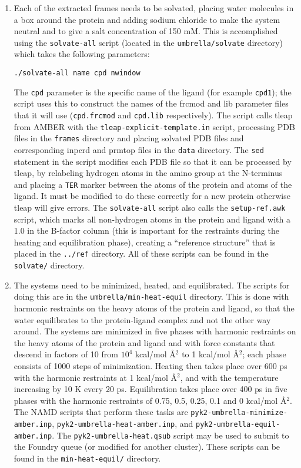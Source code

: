 \documentclass{article}      %
\begin{document}
\begin{enumerate}
\item Each of the extracted frames needs to be solvated, placing water molecules in a box around the protein and adding sodium chloride to make the system neutral and to give a salt concentration of 150 mM.  This is accomplished using the \verb+solvate-all+ script (located in the \verb+umbrella/solvate+ directory) which takes the following parameters:
\begin{verbatim}
./solvate-all name cpd nwindow
\end{verbatim}
The \verb+cpd+ parameter is the specific name of the ligand (for example \verb+cpd1+); the script uses this to construct the names of the frcmod and lib parameter files that it will use (\verb+cpd.frcmod+ and \verb+cpd.lib+ respectively).  The script calls tleap from AMBER with the \verb+tleap-explicit-template.in+ script, processing PDB files in  the \verb+frames+ directory and placing solvated PDB files and corresponding inpcrd and prmtop files in the \verb+data+ directory.  The \verb+sed+ statement in the script modifies each PDB file so that it can be processed by tleap, by relabeling hydrogen atoms in the amino group at the N-terminus and placing a \verb+TER+ marker between the atoms of the protein and atoms of the ligand.  It must be modified to do these correctly for a new protein otherwise tleap will give errors.  The \verb+solvate-all+ script also calls the \verb+setup-ref.awk+ script, which marks all non-hydrogen atoms in the protein and ligand with a 1.0 in the B-factor column (this is important for the restraints during the heating and equilibration phase), creating a ``reference structure'' that is placed in the \verb+../ref+ directory.  All of these scripts can be found in the \verb+solvate/+ directory.

\item The systems need to be minimized, heated, and equilibrated.   The scripts for doing this are in the \verb+umbrella/min-heat-equil+ directory.  This is done with harmonic restraints on the heavy atoms of the protein and ligand, so that the water equilibrates to the protein-ligand complex and not the other way around.  The systems are minimized in five phases with harmonic restraints on the heavy atoms of the protein and ligand and with force constants that descend in factors of 10 from $10^4$ kcal/mol \AA${}^2$ to 1 kcal/mol \AA${}^2$; each phase consists of 1000 steps of minimization.  Heating then takes place over 600 ps with the harmonic restraints at 1 kcal/mol \AA${}^2$, and with the temperature increasing by 10 K every 20 ps.  Equilibration takes place over 400 ps in five phases with the harmonic restraints of 0.75, 0.5, 0.25, 0.1 and 0 kcal/mol \AA${}^2$. The NAMD scripts  that perform these tasks are \verb+pyk2-umbrella-minimize-amber.inp+, \verb+pyk2-umbrella-heat-amber.inp+, and \verb+pyk2-umbrella-equil-amber.inp+.   The \verb+pyk2-umbrella-heat.qsub+ script may be used to submit to the Foundry queue (or modified for another cluster).  These scripts can be found in the \verb+min-heat-equil/+ directory.


\end{enumerate}
\end{document}
